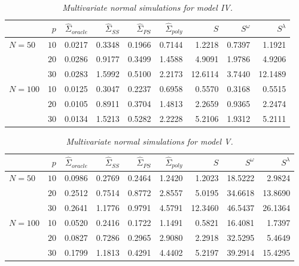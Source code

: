 %
\begin{table}[H]
\centering
\caption{\textit{Multivariate normal simulations for model IV.}}
\begin{tabular}{lrrrrrrrr}
 & $p$ & $\hat{\Sigma}_{oracle}$ & $\hat{\Sigma}_{SS}$& $\hat{\Sigma}_{PS}$ & $\hat{\Sigma}_{poly}$ & $S$ &$S^\omega$& $S^\lambda$ \\ 
  \hline
 $N = 50$ & $10$ & 0.0217 & 0.3348 & 0.1966 & 0.7144 & 1.2218 & 0.7397 & 1.1921 \\ 
   & $20$ &0.0286 & 0.9177 & 0.3499 &  1.4588 & 4.9091 & 1.9786 & 4.9206 \\ 
       & $30$ &  0.0283 &1.5992 & 0.5100 & 2.2173 & 12.6114 & 3.7440 & 12.1489 \\ 
     $N = 100$ & 10 & 0.0125 & 0.3047 & 0.2237 &  0.6958 & 0.5570 & 0.3168 & 0.5515 \\ 
       & $20$ &0.0105 & 0.8911 & 0.3704 &  1.4813 & 2.2659 & 0.9365 & 2.2474 \\ 
       & $30$ & 0.0134 & 1.5213 & 0.5282 & 2.2228 & 5.2106 & 1.9312 & 5.2111 \\ 
   \hline
\end{tabular} 
\label{table:simulation-1-entropy-loss-sigma-4}
\end{table}

%
\begin{table}[H]
\centering
\caption{\textit{Multivariate normal simulations for model V.}}
\begin{tabular}{lrrrrrrrr}
 & $p$ &$\hat{\Sigma}_{oracle}$&$\hat{\Sigma}_{SS}$& $\hat{\Sigma}_{PS}$ & $\hat{\Sigma}_{poly}$ & $S$ &$S^\omega$& $S^\lambda$ \\ 
  \hline
 $N = 50$ & $10$ &  0.0986 &0.2769 & 0.2464 & 1.2420 & 1.2023 & 18.5222 & 2.9824 \\ 
  & $20$ &0.2512 & 0.7514 & 0.8772 &  2.8557 & 5.0195 & 34.6618 & 13.8690 \\ 
  & $30$ &  0.2641& 1.1776 & 0.9791  & 4.5791 & 12.3460 & 46.5437 & 26.1364 \\ 
 $N = 100$ & 10 &0.0520 & 0.2416 & 0.1722 &  1.1491 & 0.5821 & 16.4081 & 1.7397 \\ 
  & $20$ & 0.0827 & 0.7286 & 0.2965 &  2.9080 & 2.2918 & 32.5295 & 5.4649 \\ 
   & $30$ &  0.1799 & 1.1813 & 0.4291 & 4.4402 & 5.2197 & 39.2914 & 15.4295 \\ 
   \hline
\end{tabular}\label{table:simulation-1-entropy-loss-sigma-5}
\end{table}


